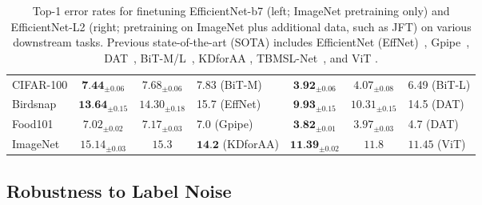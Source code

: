 \documentclass{article} %
\begin{document}
\begin{table}[h]
{\begin{tabular}{|l|ccl|ccl|}
CIFAR-100           & $\textbf{7.44}_{\pm 0.06}$                                                             & $7.68_{\pm 0.06}$            & 7.83 (BiT-M)                                                                         & $\textbf{3.92}_{\pm 0.06}$                                                             & $4.07_{\pm 0.08}$            & 6.49 (BiT-L)         \\
Birdsnap           & $\textbf{13.64}_{\pm 0.15}$                                                            & $14.30_{\pm 0.18}$           & 15.7 (EffNet)                                                                         & $\textbf{9.93}_{\pm 0.15}$                                                             & $10.31_{\pm 0.15}$           & 14.5 (DAT)          \\
Food101                       & $7.02_{\pm 0.02}$                                                             & $7.17_{\pm 0.03}$            & 7.0  (Gpipe)                                                                         & $\textbf{3.82}_{\pm 0.01}$                                                            & $3.97_{\pm 0.03}$            & 4.7 (DAT)           \\

ImageNet                       & $15.14_{\pm 0.03}$                                                             & $15.3$            & $\textbf{14.2}$  (KDforAA)                                                                         & $\textbf{11.39}_{\pm 0.02}$                                                            & $11.8$            & $11.45$ (ViT)           \\\hline
\end{tabular}}
\caption{Top-1 error rates for finetuning EfficientNet-b7 (left; ImageNet pretraining only) and EfficientNet-L2 (right; pretraining on ImageNet plus additional data, such as JFT) on various downstream tasks.  Previous state-of-the-art (SOTA) includes EfficientNet (EffNet)~\citep{efficientnet}, Gpipe~\citep{gpipe}, DAT~\citep{dat},  BiT-M/L~\citep{bitm}, KDforAA \citep{2020arXiv200311342W}, TBMSL-Net~\citep{TBMSL-Net}, and ViT \citep{2020arXiv201011929D}.}
\label{tab:finetuning}
\vspace{-0.2cm}
\end{table}

\subsection{Robustness to Label Noise}
\end{document}
